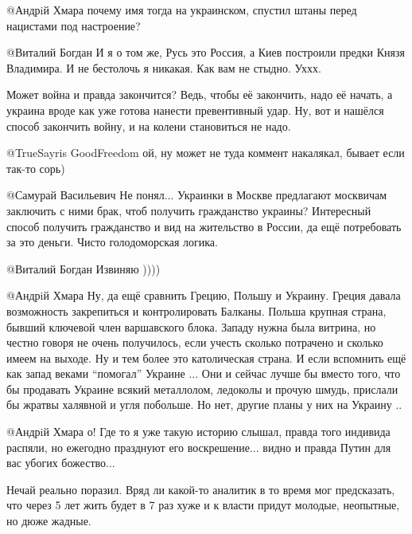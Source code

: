 \begin{itemize}
\begin{itemize}
@Андрiй Хмара  почему имя тогда на украинском, спустил штаны перед нацистами
под настроение?


@Виталий Богдан  И я о том же, Русь это Россия, а Киев построили предки Князя
Владимира. И не бестолочь я никакая. Как вам не стыдно. Уххх.


Может война и правда закончится? Ведь, чтобы её закончить, надо её начать, а
украина вроде как уже готова нанести превентивный удар. Ну, вот и нашёлся
способ закончить войну, и на колени становиться не надо.


@TrueSayris GoodFreedom  ой, ну может не туда коммент накалякал, бывает если
так-то сорь)


@Самурай Васильевич  Не понял... Украинки в Москве предлагают москвичам
заключить с ними брак, чтоб получить гражданство украины? Интересный способ
получить гражданство и вид на жительство в России, да ещё потребовать за это
деньги. Чисто голодоморская логика.


@Виталий Богдан  Извиняю ))))


@Андрiй Хмара  Ну, да ещё сравнить Грецию, Польшу и Украину. Греция давала
возможность закрепиться и контролировать Балканы. Польша крупная страна,
бывший ключевой член варшавского блока. Западу нужна была витрина, но честно
говоря не очень получилось, если учесть сколько потрачено и сколько имеем на
выходе. Ну и тем более это католическая страна. И если вспомнить ещё как
запад веками \enquote{помогал} Украине ... Они и сейчас лучше бы вместо того, что
бы продавать Украине всякий металлолом, ледоколы и прочую шмудь, прислали бы
жратвы халявной и угля побольше. Но нет, другие планы у них на Украину ..


@Андрiй Хмара  о! Где то я уже такую историю слышал, правда того индивида
распяли, но ежегодно празднуют его воскрешение... видно и правда Путин для вас
убогих божество...


\end{itemize} %


Нечай реально поразил. Вряд ли какой-то аналитик в то время мог предсказать,
что через 5 лет жить будет в 7 раз хуже и к власти придут молодые, неопытные,
но дюже жадные.


\end{itemize}
